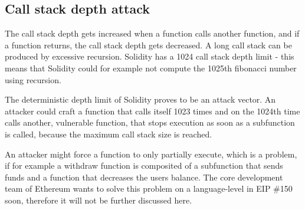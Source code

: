 \subsection{Call stack depth attack}

The call stack depth gets increased when a function calls another function, and if a function returns, the call stack depth gets decreased. A long call stack can be produced by excessive recursion. Solidity has a 1024 call stack depth limit - this means that Solidity could for example not compute the 1025th fibonacci number using recursion.

The deterministic depth limit of Solidity proves to be an attack vector. An attacker could craft a function that calls itself 1023 times and on the 1024th time calls another, vulnerable function, that stops execution as soon as a subfunction is called, because the maximum call stack size is reached. 

An attacker might force a function to only partially execute, which is a problem, if for example a withdraw function is composited of a subfunction that sends funds and a function that decreases the users balance.
The core development team of Ethereum wants to solve this problem on a language-level in EIP \#150 \cite{EIP150} soon, therefore it will not be further discussed here.
